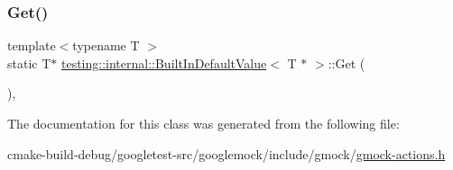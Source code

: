 \mbox{\label{classtesting_1_1internal_1_1BuiltInDefaultValue_3_01T_01_5_01_4_adc2fa2bdae767589d171ae3a117e3a9f}} 
\subsubsection{\texorpdfstring{Get()}{Get()}}
{\footnotesize\ttfamily template$<$typename T $>$ \\
static T$\ast$ \mbox{\hyperlink{classtesting_1_1internal_1_1BuiltInDefaultValue}{testing\+::internal\+::\+Built\+In\+Default\+Value}}$<$ T $\ast$ $>$\+::Get (\begin{DoxyParamCaption}{ }\end{DoxyParamCaption})\hspace{0.3cm}{\ttfamily [inline]}, {\ttfamily [static]}}



The documentation for this class was generated from the following file\+:\begin{DoxyCompactItemize}
\item 
cmake-\/build-\/debug/googletest-\/src/googlemock/include/gmock/\mbox{\hyperlink{gmock-actions_8h}{gmock-\/actions.\+h}}\end{DoxyCompactItemize}
